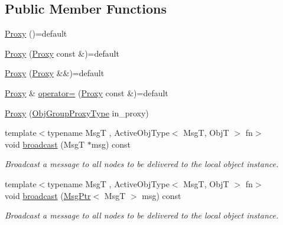 \subsection*{Public Member Functions}
\begin{DoxyCompactItemize}
\item 
\hyperlink{structvt_1_1objgroup_1_1proxy_1_1_proxy_a5450776d9cabb2556765c0d0227c9589}{Proxy} ()=default
\item 
\hyperlink{structvt_1_1objgroup_1_1proxy_1_1_proxy_ad12a9b75a3c4844144d7a159b11af5ec}{Proxy} (\hyperlink{structvt_1_1objgroup_1_1proxy_1_1_proxy}{Proxy} const \&)=default
\item 
\hyperlink{structvt_1_1objgroup_1_1proxy_1_1_proxy_a8711a58bb0444c24553527b6ed9d0cfb}{Proxy} (\hyperlink{structvt_1_1objgroup_1_1proxy_1_1_proxy}{Proxy} \&\&)=default
\item 
\hyperlink{structvt_1_1objgroup_1_1proxy_1_1_proxy}{Proxy} \& \hyperlink{structvt_1_1objgroup_1_1proxy_1_1_proxy_a2fb8dafa11b8c8f70888118bdc2f1b60}{operator=} (\hyperlink{structvt_1_1objgroup_1_1proxy_1_1_proxy}{Proxy} const \&)=default
\item 
\hyperlink{structvt_1_1objgroup_1_1proxy_1_1_proxy_ab76d59446c73ebf1cea9c80fd70fbd6b}{Proxy} (\hyperlink{namespacevt_ad7cae989df485fccca57f0792a880a8e}{Obj\+Group\+Proxy\+Type} in\+\_\+proxy)
\item 
{\footnotesize template$<$typename MsgT , Active\+Obj\+Type$<$ Msg\+T, Obj\+T $>$ fn$>$ }\\void \hyperlink{structvt_1_1objgroup_1_1proxy_1_1_proxy_a0b716ca776b1f06e0d7d45afbe9e5274}{broadcast} (MsgT $\ast$msg) const
\begin{DoxyCompactList}\small\item\em Broadcast a message to all nodes to be delivered to the local object instance. \end{DoxyCompactList}\item 
{\footnotesize template$<$typename MsgT , Active\+Obj\+Type$<$ Msg\+T, Obj\+T $>$ fn$>$ }\\void \hyperlink{structvt_1_1objgroup_1_1proxy_1_1_proxy_a7616a82936034b59e1b05c6b033236a2}{broadcast} (\hyperlink{namespacevt_a9f5ebd62ee9d6dd8829e3e1cc4f858e9}{Msg\+Ptr}$<$ MsgT $>$ msg) const
\begin{DoxyCompactList}\small\item\em Broadcast a message to all nodes to be delivered to the local object instance. \end{DoxyCompactList}\item 

\end{DoxyCompactItemize}
